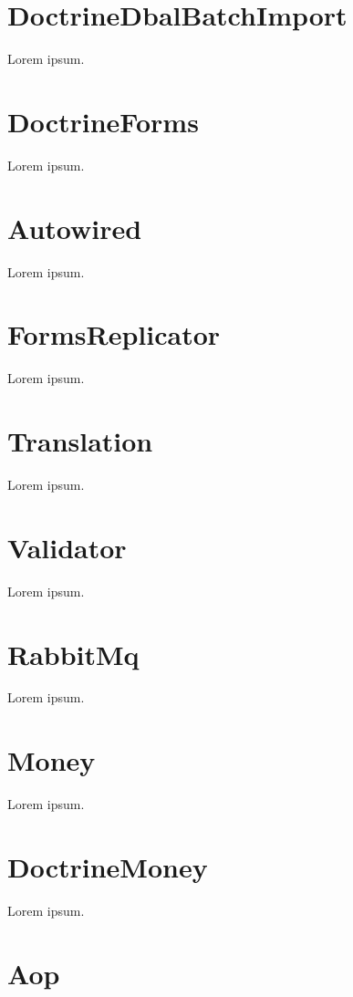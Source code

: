 \section{DoctrineDbalBatchImport}

Lorem ipsum.

\section{DoctrineForms}

Lorem ipsum.

\section{Autowired}

Lorem ipsum.

\section{FormsReplicator}

Lorem ipsum.

\section{Translation}

Lorem ipsum.

\section{Validator}

Lorem ipsum.

\section{RabbitMq}

Lorem ipsum.

\section{Money}

Lorem ipsum.

\section{DoctrineMoney}

Lorem ipsum.

\section{Aop}

